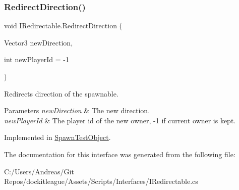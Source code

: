 \subsubsection{\texorpdfstring{Redirect\+Direction()}{RedirectDirection()}}
{\footnotesize\ttfamily void I\+Redirectable.\+Redirect\+Direction (\begin{DoxyParamCaption}\item[{Vector3}]{new\+Direction,  }\item[{int}]{new\+Player\+Id = {\ttfamily -\/1} }\end{DoxyParamCaption})}



Redirects direction of the spawnable. 


\begin{DoxyParams}{Parameters}
{\em new\+Direction} & The new direction.\\
\hline
{\em new\+Player\+Id} & The player id of the new owner, -\/1 if current owner is kept.\\
\hline
\end{DoxyParams}


Implemented in \hyperlink{class_spawn_test_object_a30ea3b6eb99e3803d605ec659c5270ce}{Spawn\+Test\+Object}.



The documentation for this interface was generated from the following file\+:\begin{DoxyCompactItemize}
\item 
C\+:/\+Users/\+Andreas/\+Git Repos/dockitleague/\+Assets/\+Scripts/\+Interfaces/I\+Redirectable.\+cs\end{DoxyCompactItemize}
